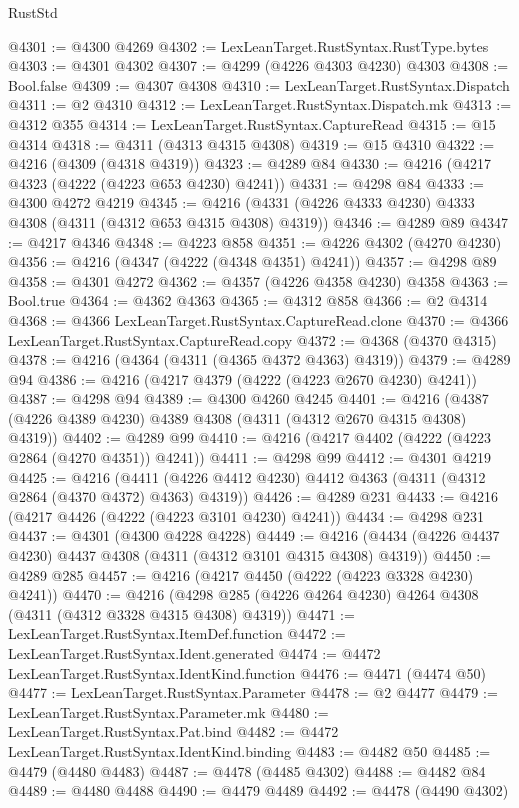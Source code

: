 \begin{lexlean}{RustStd}
\begin{coremodule}
@4301 := @4300 @4269
@4302 := LexLeanTarget.RustSyntax.RustType.bytes
@4303 := @4301 @4302
@4307 := @4299 (@4226 @4303 @4230) @4303
@4308 := Bool.false
@4309 := @4307 @4308
@4310 := LexLeanTarget.RustSyntax.Dispatch
@4311 := @2 @4310
@4312 := LexLeanTarget.RustSyntax.Dispatch.mk
@4313 := @4312 @355
@4314 := LexLeanTarget.RustSyntax.CaptureRead
@4315 := @15 @4314
@4318 := @4311 (@4313 @4315 @4308)
@4319 := @15 @4310
@4322 := @4216 (@4309 (@4318 @4319))
@4323 := @4289 @84
@4330 := @4216 (@4217 @4323 (@4222 (@4223 @653 @4230) @4241))
@4331 := @4298 @84
@4333 := @4300 @4272 @4219
@4345 := @4216 (@4331 (@4226 @4333 @4230) @4333 @4308 (@4311 (@4312 @653 @4315 @4308) @4319))
@4346 := @4289 @89
@4347 := @4217 @4346
@4348 := @4223 @858
@4351 := @4226 @4302 (@4270 @4230)
@4356 := @4216 (@4347 (@4222 (@4348 @4351) @4241))
@4357 := @4298 @89
@4358 := @4301 @4272
@4362 := @4357 (@4226 @4358 @4230) @4358
@4363 := Bool.true
@4364 := @4362 @4363
@4365 := @4312 @858
@4366 := @2 @4314
@4368 := @4366 LexLeanTarget.RustSyntax.CaptureRead.clone
@4370 := @4366 LexLeanTarget.RustSyntax.CaptureRead.copy
@4372 := @4368 (@4370 @4315)
@4378 := @4216 (@4364 (@4311 (@4365 @4372 @4363) @4319))
@4379 := @4289 @94
@4386 := @4216 (@4217 @4379 (@4222 (@4223 @2670 @4230) @4241))
@4387 := @4298 @94
@4389 := @4300 @4260 @4245
@4401 := @4216 (@4387 (@4226 @4389 @4230) @4389 @4308 (@4311 (@4312 @2670 @4315 @4308) @4319))
@4402 := @4289 @99
@4410 := @4216 (@4217 @4402 (@4222 (@4223 @2864 (@4270 @4351)) @4241))
@4411 := @4298 @99
@4412 := @4301 @4219
@4425 := @4216
    (@4411 (@4226 @4412 @4230) @4412 @4363 (@4311 (@4312 @2864 (@4370 @4372) @4363) @4319))
@4426 := @4289 @231
@4433 := @4216 (@4217 @4426 (@4222 (@4223 @3101 @4230) @4241))
@4434 := @4298 @231
@4437 := @4301 (@4300 @4228 @4228)
@4449 := @4216 (@4434 (@4226 @4437 @4230) @4437 @4308 (@4311 (@4312 @3101 @4315 @4308) @4319))
@4450 := @4289 @285
@4457 := @4216 (@4217 @4450 (@4222 (@4223 @3328 @4230) @4241))
@4470 := @4216 (@4298 @285 (@4226 @4264 @4230) @4264 @4308 (@4311 (@4312 @3328 @4315 @4308) @4319))
@4471 := LexLeanTarget.RustSyntax.ItemDef.function
@4472 := LexLeanTarget.RustSyntax.Ident.generated
@4474 := @4472 LexLeanTarget.RustSyntax.IdentKind.function
@4476 := @4471 (@4474 @50)
@4477 := LexLeanTarget.RustSyntax.Parameter
@4478 := @2 @4477
@4479 := LexLeanTarget.RustSyntax.Parameter.mk
@4480 := LexLeanTarget.RustSyntax.Pat.bind
@4482 := @4472 LexLeanTarget.RustSyntax.IdentKind.binding
@4483 := @4482 @50
@4485 := @4479 (@4480 @4483)
@4487 := @4478 (@4485 @4302)
@4488 := @4482 @84
@4489 := @4480 @4488
@4490 := @4479 @4489
@4492 := @4478 (@4490 @4302)

\end{coremodule}
\end{lexlean}
